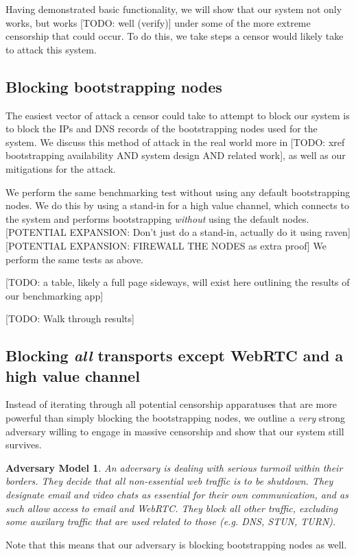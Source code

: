 \documentclass[12pt]{report}
\newtheorem{adversary}{Adversary Model}
\begin{document}
Having demonstrated basic functionality, we will show that our system not only works, but works [TODO: well (verify)] under some of the more extreme censorship that could occur. To do this, we take steps a censor would likely take to attack this system.

\subsection{Blocking bootstrapping nodes}

The easiest vector of attack a censor could take to attempt to block our system is to block the IPs and DNS records of the bootstrapping nodes used for the system. We discuss this method of attack in the real world more in [TODO: xref bootstrapping availability AND system design AND related work], as well as our mitigations for the attack.

We perform the same benchmarking test without using any default bootstrapping nodes. We do this by using a stand-in for a high value channel, which connects to the system and performs bootstrapping \emph{without} using the default nodes. [POTENTIAL EXPANSION: Don't just do a stand-in, actually do it using raven] [POTENTIAL EXPANSION: FIREWALL THE NODES as extra proof] We perform the same tests as above.

[TODO: a table, likely a full page sideways, will exist here outlining the results of our benchmarking app]

[TODO: Walk through results]

\subsection{Blocking \emph{all} transports except WebRTC and a high value channel}

Instead of iterating through all potential censorship apparatuses that are more powerful than simply blocking the bootstrapping nodes, we outline a \emph{very} strong adversary willing to engage in massive censorship and show that our system still survives.
\begin{adversary}
An adversary is dealing with serious turmoil within their borders. They decide that all non-essential web traffic is to be shutdown. They designate email and video chats as essential for their own communication, and as such allow access to email and WebRTC. They block all other traffic, excluding some auxilary traffic that are used related to those (e.g. DNS, STUN, TURN).
\end{adversary}
Note that this means that our adversary is blocking bootstrapping nodes as well.
\end{document}
